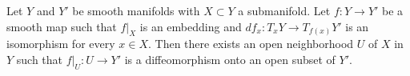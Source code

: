 Let $Y$ and $Y'$ be smooth manifolds with $X \subset Y$ a submanifold. Let $f: Y \to Y'$ be a smooth map such that $f|_X$ is an embedding and $df_x: T_x Y \to T_{f(x)} Y'$ is an isomorphism for every $x \in X$. Then there exists an open neighborhood $U$ of $X$ in $Y$ such that $f|_U: U \to Y'$ is a diffeomorphism onto an open subset of $Y'$.
